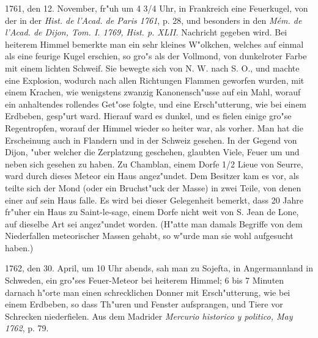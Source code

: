 \documentclass[a4paper, 11pt, oneside, polutonikogreek, german]{article}
\begin{document}
1761, den 12. November, fr"uh um 4 3/4 Uhr, in Frankreich eine Feuerkugel, von der in der \emph{Hist. de l'Acad. de Paris 1761}, p. 28, und besonders in den \emph{Mém. de l'Acad. de Dijon, Tom. I. 1769, Hist. p. XLII.} Nachricht gegeben wird. Bei heiterem Himmel bemerkte man ein sehr kleines W"olkchen, welches auf einmal als eine feurige Kugel erschien, so gro"s als der Vollmond, von dunkelroter Farbe mit einem lichten Schweif. Sie bewegte sich von N. W. nach S. O., und machte eine Explosion, wodurch nach allen Richtungen Flammen geworfen wurden, mit einem Krachen, wie wenigstens zwanzig Kanonensch"usse auf ein Mahl, worauf ein anhaltendes rollendes Get"ose folgte, und eine Ersch"utterung, wie bei einem Erdbeben, gesp"urt ward. Hierauf ward es dunkel, und es fielen einige gro"se Regentropfen, worauf der Himmel wieder so heiter war, als vorher. Man hat die Erscheinung auch in Flandern und in der Schweiz gesehen. In der Gegend von Dijon, "uber welcher die Zerplatzung geschehen, glaubten Viele, Feuer um und neben sich gesehen zu haben. Zu Chamblan, einem Dorfe 1/2 Lieue von Seurre, ward durch dieses Meteor ein Haus angez"undet. Dem Besitzer kam es vor, als teilte sich der Mond (oder ein Bruchst"uck der Masse) in zwei Teile, von denen einer auf sein Haus falle. Es wird bei dieser Gelegenheit bemerkt, dass 20 Jahre fr"uher ein Haus zu Saint-le-sage, einem Dorfe nicht weit von S. Jean de Lone, auf dieselbe Art sei angez"undet worden. (H"atte man damals Begriffe von dem Niederfallen meteorischer Massen gehabt, so w"urde man sie wohl aufgesucht haben.)

1762, den 30. April, um 10 Uhr abends, sah man zu Sojefta, in Angermannland in Schweden, ein gro"ses Feuer-Meteor bei heiterem Himmel; 6 bis 7 Minuten darnach h"orte man einen schrecklichen Donner mit Ersch"utterung, wie bei einem Erdbeben, so dass Th"uren und Fenster aufsprangen, und Tiere vor Schrecken niederfielen. Aus dem Madrider \emph{Mercurio historico y politico, May 1762}, p. 79.
\end{document}
